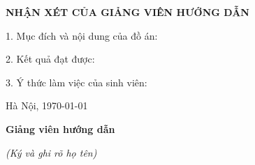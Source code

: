 \newpage
\begin{center}
{\bfseries NHẬN XÉT CỦA GIẢNG VIÊN HƯỚNG DẪN}
\end{center}
1.	Mục đích và nội dung của đồ án:

\vspace{4ex} %

2.	Kết quả đạt được:

3.	Ý thức làm việc của sinh viên:

Hà Nội, \today

\textbf{Giảng viên hướng dẫn}

\textit{(Ký và ghi rõ họ tên)}

\newpage
